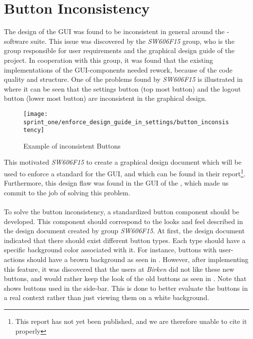 \section{Button Inconsistency}
\label{sub:button_inconsistency}

The design of the GUI was found to be inconsistent in general around the \giraf-software suite. This issue was discovered by the \emph{SW606F15} group, who is the group responsible for user requirements and the graphical design guide of the project. In cooperation with this group, it was found that the existing implementations of the GUI-components needed rework, because of the code quality and structure.  One of the problems found by \emph{SW606F15} is illustrated in  where it can be seen that the settings button (top most button) and the logout button (lower most button) are inconsistent in the graphical design.

\begin{figure}[!htbp]
    \centering
    \texttt{[image: sprint\_one/enforce\_design\_guide\_in\_settings/button\_inconsistency]}
    \caption{Example of inconsistent Buttons}
    \label{fig:button_inconsistency}
\end{figure}

This motivated \emph{SW606F15} to create a graphical design document which will be used to enforce a standard for the GUI, and which can be found in their report\footnote{This report has not yet been published, and we are therefore unable to cite it properly}. Furthermore, this design flaw was found in the GUI of the \launcher, which made us commit to the job of solving this problem.
\\\\
To solve the button inconsistency, a standardized button component should be developed. This component should correspond to the looks and feel described in the design document created by group \emph{SW606F15}. At first, the design document indicated that there should exist different button types. Each type should have a specific background color associated with it. For instance, buttons with user-actions should have a brown background as seen in . However, after implementing this feature, it was discovered that the users at \emph{Birken} did not like these new buttons, and would rather keep the look of the old buttons as seen in .  Note that  shows buttons used in the \launcher side-bar. This is done to better evaluate the buttons in a real context rather than just viewing them on a white background.  

